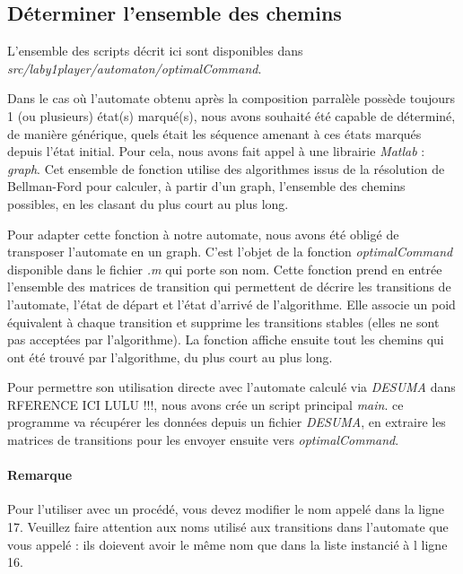 \subsection{Déterminer l'ensemble des chemins} %
\begin{center}
L'ensemble des scripts décrit ici sont disponibles dans \emph{src/laby1player/automaton/optimalCommand}.
\end{center}
Dans le cas où l'automate obtenu après la composition parralèle possède toujours 1 (ou plusieurs) état(s) marqué(s), nous avons souhaité été capable de déterminé, de manière générique, quels était les séquence amenant à ces états marqués depuis l'état initial. Pour cela, nous avons fait appel à une librairie \emph{Matlab} : \emph{graph}. Cet ensemble de fonction utilise des algorithmes issus de la résolution de Bellman-Ford pour calculer, à partir d'un graph, l'ensemble des chemins possibles, en les clasant du plus court au plus long.

Pour adapter cette fonction à notre automate, nous avons été obligé de transposer l'automate en un graph. C'est l'objet de la fonction \emph{optimalCommand} disponible dans le fichier \emph{.m} qui porte son nom. Cette fonction prend en entrée l'ensemble des matrices de transition qui permettent de décrire les transitions de l'automate, l'état de départ et l'état d'arrivé de l'algorithme. Elle associe un poid équivalent à chaque transition et supprime les transitions stables (elles ne sont pas acceptées par l'algorithme). La fonction affiche ensuite tout les chemins qui ont été trouvé par l'algorithme, du plus court au plus long. 

Pour permettre son utilisation directe avec l'automate calculé via \emph{DESUMA} dans RFERENCE ICI  LULU !!!, nous avons crée un script principal \emph{main}. ce programme va récupérer les données depuis un fichier \emph{DESUMA}, en extraire les matrices de transitions pour les envoyer ensuite vers \emph{optimalCommand}. 


\paragraph*{Remarque} Pour l'utiliser avec un procédé, vous devez modifier le nom appelé dans la ligne 17. Veuillez faire attention aux noms utilisé aux transitions dans l'automate que vous appelé : ils doievent avoir le même nom que dans la liste instancié à l ligne 16.

